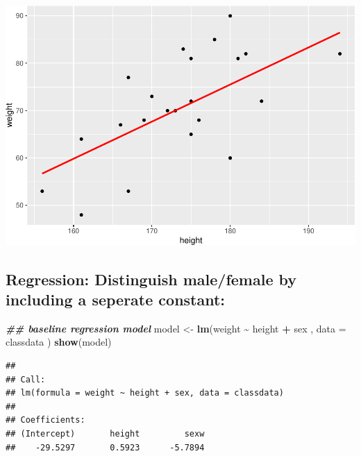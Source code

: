 \documentclass[
  doc]{apa6}
\newenvironment{Shaded}{\begin{snugshade}}{\end{snugshade}}
\newcommand{\AttributeTok}[1]{\textcolor[rgb]{0.13,0.29,0.53}{#1}}
\newcommand{\DecValTok}[1]{\textcolor[rgb]{0.00,0.00,0.81}{#1}}
\newcommand{\DocumentationTok}[1]{\textcolor[rgb]{0.56,0.35,0.01}{\textbf{\textit{#1}}}}
\newcommand{\FunctionTok}[1]{\textcolor[rgb]{0.13,0.29,0.53}{\textbf{#1}}}
\newcommand{\NormalTok}[1]{#1}
\newcommand{\OtherTok}[1]{\textcolor[rgb]{0.56,0.35,0.01}{#1}}
\newcommand{\SpecialCharTok}[1]{\textcolor[rgb]{0.81,0.36,0.00}{\textbf{#1}}}
\begin{document}
\includegraphics{rmd_reg_files/figure-latex/unnamed-chunk-9-1.pdf}

\newpage

\subsection{Regression: Distinguish male/female by including a seperate constant:}\label{regression-distinguish-malefemale-by-including-a-seperate-constant}

\begin{Shaded}
\begin{Highlighting}[]
\DocumentationTok{\#\# baseline regression  model}
\NormalTok{model  }\OtherTok{\textless{}{-}} \FunctionTok{lm}\NormalTok{(weight }\SpecialCharTok{\textasciitilde{}}\NormalTok{ height }\SpecialCharTok{+}\NormalTok{ sex , }\AttributeTok{data =}\NormalTok{ classdata )}
\FunctionTok{show}\NormalTok{(model)}
\end{Highlighting}
\end{Shaded}

\begin{verbatim}
## 
## Call:
## lm(formula = weight ~ height + sex, data = classdata)
## 
## Coefficients:
## (Intercept)       height         sexw  
##    -29.5297       0.5923      -5.7894
\end{verbatim}

\begin{Shaded}
\end{Shaded}
\end{document}
